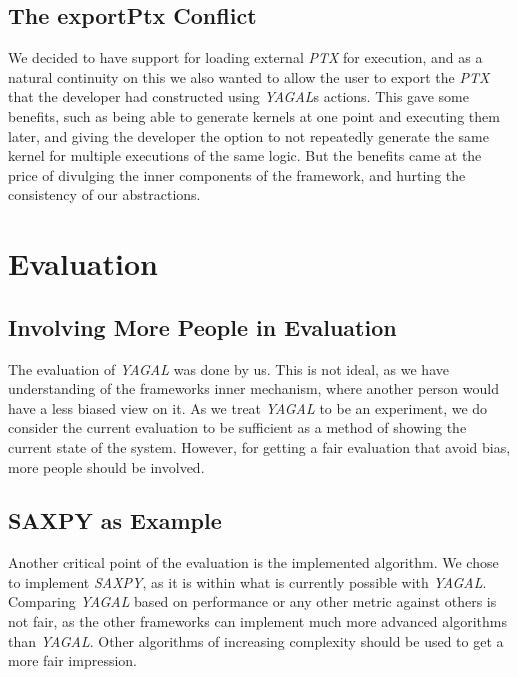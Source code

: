 \subsection*{The exportPtx Conflict}
We decided to have support for loading external \textit{PTX} for execution, and as a natural continuity on this we also wanted to allow the user to export the \textit{PTX} that the developer had constructed using \textit{YAGAL}s actions. This gave some benefits, such as being able to generate kernels at one point and executing them later, and giving the developer the option to not repeatedly generate the same kernel for multiple executions of the same logic. But the benefits came at the price of divulging the inner components of the framework, and hurting the consistency of our abstractions.

\section*{Evaluation}
\subsection*{Involving More People in Evaluation}
The evaluation of \textit{YAGAL} was done by us. This is not ideal, as we have understanding of the frameworks inner mechanism, where another person would have a less biased view on it. As we treat \textit{YAGAL} to be an experiment, we do consider the current evaluation to be sufficient as a method of showing the current state of the system. However, for getting a fair evaluation that avoid bias, more people should be involved.

\subsection*{SAXPY as Example}
Another critical point of the evaluation is the implemented algorithm. We chose to implement \textit{SAXPY}, as it is within what is currently possible with \textit{YAGAL}. Comparing \textit{YAGAL} based on performance or any other metric against others is not fair, as the other frameworks can implement much more advanced algorithms than \textit{YAGAL}. Other algorithms of increasing complexity should be used to get a more fair impression.
